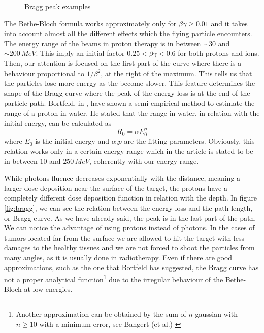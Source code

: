 \documentclass[12pt, a4paper, twoside]{book}
\begin{document}
\begin{figure}[!ht]
     \hfill
\hspace{2mm}
\caption{Bragg peak examples}
   \end{figure}
The Bethe-Bloch formula works approximately only for $\beta\gamma\ge 0.01$ and it takes into account almost all the different effects which the flying particle encounters. The energy range of the beams in proton therapy is in between $\sim30$ and $\sim200\,MeV$. This imply an initial factor $0.25<\beta\gamma<0.6$ for both protons and ions. Then, our attention is focused on the first part of the curve where there is a behaviour proportional to $1/\beta^2$, at the right of the maximum. This tells us that the particles lose more energy as the become slower. This feature determines the shape of the Bragg curve where the peak of the energy loss is at the end of the particle path.
Bortfeld, in \cite{bort:bragg}, have shown a semi-empirical method to estimate the range of a proton in water. He stated that the range in water, in relation with the initial energy, can be calculated as
\[
R_0 = \alpha E_0^p
\]
where $E_0$ is the initial energy and $\alpha$,$p$ are the fitting parameters. Obviously, this relation works only in a certain energy range which in the article is stated to be in between $10$ and $250\,MeV$, coherently with our energy range.

While photons fluence decreases exponentially with the distance, meaning a larger dose deposition near the surface of the target, the protons have a completely different dose deposition function in relation with the depth.
In figure \ref{fig:bragg}, we can see the relation between the energy loss and the path length, or Bragg curve. As we have already said, the peak is in the last part of the path. We can notice the advantage of using protons instead of photons. In the cases of tumors located far from the surface we are allowed to hit the target with less damages to the healthy tissues and we are not forced to shoot the particles from many angles, as it is usually done in radiotherapy.
Even if there are good approximations, such as the one that Bortfeld has suggested, the Bragg curve has not a proper analytical function\footnote{Another approximation can be obtained by the sum of $n$ gaussian with $n\geq 10$ with a minimum error, see Bangert (et al.) \cite{bang:apm}} due to the irregular behaviour of the Bethe-Bloch at low energies.
\end{document}
